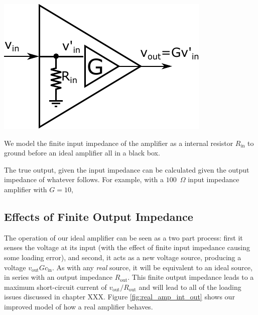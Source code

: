 \documentclass{tufte-book}
\begin{document}
\begin{marginfigure}%
  \includegraphics[width=\linewidth]{RealAmplifier_int}
  \caption{We model the finite input impedance of the amplifier as a internal resistor $R_\text{in}$ to ground before an ideal amplifier all in a black box.}
  \label{fig:real_amp_int}
\end{marginfigure}


The true output, given the input impedance can be calculated given the output impedance of whatever follows. For example, with a $100$~$\Omega$ input impedance amplifier with $G = 10$, 

\subsection{Effects of Finite Output Impedance}
The operation of our ideal amplifier can be seen as a two part process: first it senses the voltage at its input (with the effect of finite input impedance causing some loading error), and second, it acts as a new voltage source, producing a voltage $v_\text{out} Gc_\text{in}$. As with any \textit{real} source, it will be equivalent to an ideal source, in series with an output impedance $R_\text{out}$. This finite output impedance leads to a maximum short-circuit current of $v_\text{out}/R_\text{out}$ and will lead to all of the loading issues discussed in chapter XXX. Figure \ref{fig:real_amp_int_out} shows our improved model of how a real amplifier behaves.
\end{document}
